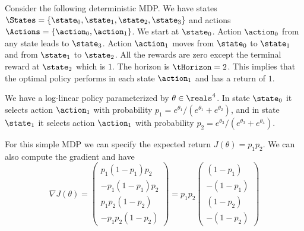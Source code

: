 \begin{example}
Consider the following deterministic MDP. We have states
$\States=\{\state_0,\state_1,\state_2,\state_3\}$ and actions
$\Actions=\{\action_0,\action_1\}$. We start at $\state_0$. Action
$\action_0$ from any state leads to $\state_3$. Action $\action_1$
moves from $\state_0$ to $\state_1$ and from $\state_1$ to
$\state_2$. All the rewards are zero except the terminal reward at
$\state_2$ which is $1$. The horizon is $\tHorizon=2$. This implies
that the optimal policy performs in each state $\action_1$ and has a
return of $1$.

We have a log-linear policy parameterized by $\theta\in\reals^4$. In
state $\state_0$ it selects action $\action_1$ with probability
$p_1=e^{\theta_1}/(e^{\theta_1}+e^{\theta_2})$, and in state
$\state_1$ it selects action $\action_1$ with probability
$p_2=e^{\theta_3}/(e^{\theta_3}+e^{\theta_4})$.

For this simple MDP we can specify the expected return
$J(\theta)=p_1p_2$. We can also compute the gradient and have
\[
\nabla J(\theta)=\begin{pmatrix}p_1(1-p_1)p_2\\
-p_1(1-p_1)p_2 \\  p_1 p_2 (1-p_2) \\ -p_1 p_2 (1-p_2)\end{pmatrix}= p_1 p_2\begin{pmatrix}(1-p_1)\\
-(1-p_1) \\  (1-p_2) \\ - (1-p_2)\end{pmatrix}
\]


\end{example}
